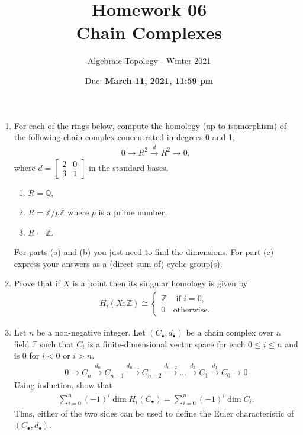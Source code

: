 \documentclass{article}
\title{Homework 06 \\ Chain Complexes}
\author{Algebraic Topology - Winter 2021}
\date{Due: \textbf{March 11, 2021, 11:59 pm}}
\begin{document}
\maketitle

\begin{enumerate}
    \item For each of the rings below, compute the homology (up to isomorphism) of the following chain complex concentrated in degrees 0 and 1,
    \begin{align*}
        0 \to R^2 \overset{d}{\longrightarrow} R^2 \to 0,
    \end{align*}
    where $d = \begin{bmatrix} 2 & 0 \\ 3 & 1\end{bmatrix}$ in the standard bases.
    \begin{enumerate}
        \item $ R = \mathbb{Q}$,
        \item $ R = \mathbb{Z}/p \mathbb{Z}$ where $p$ is a prime number,
        \item $ R = \mathbb{Z}$.
    \end{enumerate}
    For parts (a) and (b) you just need to find the dimensions. For part (c) express your answers as a (direct sum of) cyclic group(s).
    \item Prove that if $X$ is a point then its singular homology is given by
    \begin{align*}
        H_i(X; \mathbb{Z}) \cong 
        \begin{cases}
        \mathbb{Z} & \mbox{ if } i = 0, \\
        0 & \mbox{otherwise.}
        \end{cases}
    \end{align*}
    
        \item Let $n$ be a non-negative integer. Let $(C_\bullet, d_\bullet)$ be a chain complex over a field $\mathbb{F}$ such that $C_i$ is a finite-dimensional vector space for each $ 0 \le i \le n$ and is 0 for $ i < 0$ or $i > n$. 
    \begin{align*}
        0 \to C_n \overset{d_n}{\longrightarrow} C_{n-1}
        \overset{d_{n-1}}{\longrightarrow} C_{n-2}
        \overset{d_{n-2}}{\longrightarrow} 
        \dots
        \overset{d_{2}}{\longrightarrow} C_1
        \overset{d_{1}}{\longrightarrow} C_0
        \to 0
    \end{align*}
    Using induction, show that 
    \begin{align*}
        \sum \limits_{i=0}^n (-1)^i\dim H_i (C_\bullet) =        
        \sum \limits_{i=0}^n (-1)^i\dim C_i.
    \end{align*}
    Thus, either of the two sides can be used to define the Euler characteristic of $(C_\bullet, d_\bullet)$.
    
\end{enumerate}
\end{document}
